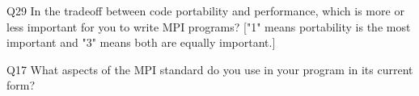 \begin{description}%
\item{Q29} In the tradeoff between code portability and performance, which is more or less important for you to write MPI programs? ["1" means portability is the most important and "3" means both are equally important.]%
\item{Q17} What aspects of the MPI standard do you use in your program in its current form?%
\end{description}%
